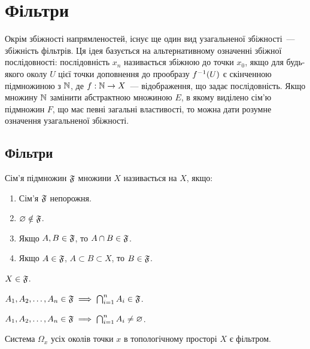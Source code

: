 \chapter{Фільтри}

Окрім збіжності напрямленостей, існує ще один вид узагальненої збіжності~--- збіжність фільтрів. Ця ідея базується на альтернативному означенні збіжної послідовності: послідовність $x_n$ називається збіжною до точки $x_0$, якщо для будь-якого околу $U$ цієї точки доповнення до прообразу $f\inv (U)$ є скінченною підмножиною з $\NN$, де $f: \NN \to X$~--- відображення, що задає послідовність. Якщо множину $\NN$ замінити абстрактною множиною $E$, в якому виділено сім'ю підмножин $F$, що має певні загальні властивості, то можна дати розумне означення узагальненої збіжності.

\section{Фільтри}

\begin{definition}
    Сім'я підмножин $\frak F$ множини $X$ називається  на $X$, якщо:
    \begin{enumerate}
        \item Сім'я $\frak F$ непорожня.
        \item $\emptyset \notin \frak F$.
        \item Якщо $A, B \in \frak F$, то $A \cap B \in \frak F$.
        \item Якщо $A \in \frak F$, $A \subset B \subset X$, то $B \in \frak F$.
    \end{enumerate}
\end{definition}

\begin{corollary}
    $X \in \frak F$.
\end{corollary}

\begin{corollary}
    $A_1, A_2, \dots, A_n \in \frak F \implies \bigcap_{i = 1}^n A_i \in \frak F$.
\end{corollary}

\begin{corollary}
    $A_1, A_2, \dots, A_n \in \frak F \implies \bigcap_{i = 1}^n A_i \ne \emptyset$.
\end{corollary}

\begin{example}
    Система $\Omega_x$ усіх околів точки $x$ в топологічному просторі $X$ є фільтром.
\end{example}

